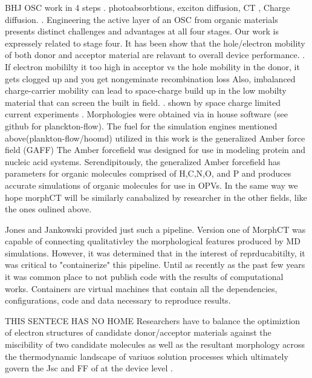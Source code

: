 BHJ OSC work in 4 steps . photoabsorbtions, exciton diffusion, CT , Charge diffusion. \citet{Fusella2019}.
Engineering the active layer of an OSC from organic materials presents distinct challenges and advantages at
all four stages. 
\indent Our work is expressely related to stage four. It has been show that the hole/electron mobility of both donor and acceptor material are
relavant to overall device performance. \cite{Wang2019e}. If electron mobililty it too high
in acceptor vs the hole mobility in the donor, it gets clogged up and you get nongeminate recombination loss
Also, imbalanced charge-carrier mobility can lead to space-charge build up in the low mobilty material that
can screen the built in field.  \cite{Bartelt2015}. shown by space charge limited current experiments
\cite{Small2013}.
Morphologies were obtained via in house software (see github for planckton-flow).  The
fuel for the simulation engines mentioned above(plankton-flow/hoomd) utilized in this work is the generalized
Amber force field (GAFF)\cite{Wang2004a} The Amber forcefield was designed for use in modeling protein and
nucleic acid systems.  Serendipitously, the generalized Amber forcefield has parameters for organic molecules
comprised of H,C,N,O, and P and produces accurate simulations of organic molecules for use in OPVs. In the
same way we hope morphCT will be similarly canabalized by researcher in the other fields, like the ones oulined above. 


\indent Jones and Jankowski provided just such a pipeline. Version one of MorphCT was capable of
connecting qualitativley the morphological features produced by MD simulations. However, it was determined
that in the interest of reprducabitilty, it was critical to "containerize" this pipeline. Until as recently as
the past few years it was common place to not publish code with the results of computational works. Containers
are virtual machines that contain all the dependencies, configurations, code and data necessary to reproduce
results. \cite{Cito2016a}

THIS SENTECE HAS NO HOME Researchers have to
balance the optimiztion of electron structures of candidate donor/acceptor materials against the miscibility
of two candidate molecules as well as the resultant morphology across the thermodynamic landscape of
variuos solution processes which ultimately govern the Jsc and FF of at the device level \cite{Zhu2020a}. 
